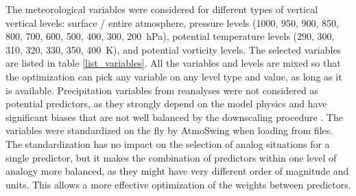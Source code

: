 \documentclass[draft]{agujournal2019}
\begin{document}
The meteorological variables were considered for different types of vertical vertical levels: surface / entire atmosphere, pressure levels (1000, 950, 900, 850, 800, 700, 600, 500, 400, 300, 200~hPa), potential temperature levels (290, 300, 310, 320, 330, 350, 400~K), and potential vorticity levels. The selected variables are listed in table \ref{list_variables}. All the variables and levels are mixed so that the optimization can pick any variable on any level type and value, as long as it is available. Precipitation variables from reanalyses were not considered as potential predictors, as they strongly depend on the model physics \cite{Rienecker2011} and have significant biases that are not well balanced by the downscaling procedure \cite{Dayon2015}. The variables were standardized on the fly by AtmoSwing when loading from files. The standardization has no impact on the selection of analog situations for a single predictor, but it makes the combination of predictors within one level of analogy more balanced, as they might have very different order of magnitude and units. This allows a more effective optimization of the weights between predictors. 

\end{document}
